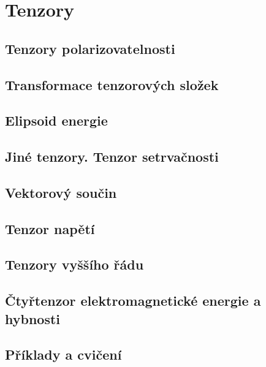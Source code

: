 {
\chapter{Tenzory}\label{fyz:IIchapXXXI}
\minitoc
  \section{Tenzory polarizovatelnosti}\label{fyz:IIchapXXXIsecI}
  \section{Transformace tenzorových složek}\label{fyz:IIchapXXXIsecII}
  \section{Elipsoid energie}\label{fyz:IIchapXXXIsecIII}
  \section{Jiné tenzory. Tenzor setrvačnosti}\label{fyz:IIchapXXXIsecIV}
  \section{Vektorový součin}\label{fyz:IIchapXXXIsecV}
  \section{Tenzor napětí}\label{fyz:IIchapXXXIsecVI}
  \section{Tenzory vyššího řádu}\label{fyz:IIchapXXXIsecVII}
  \section{Čtyřtenzor elektromagnetické energie a hybnosti}\label{fyz:IIchapXXXIsecVIII}
  \section{Příklady a cvičení}\label{fyz:IIchapXXXIsecIX}

}
